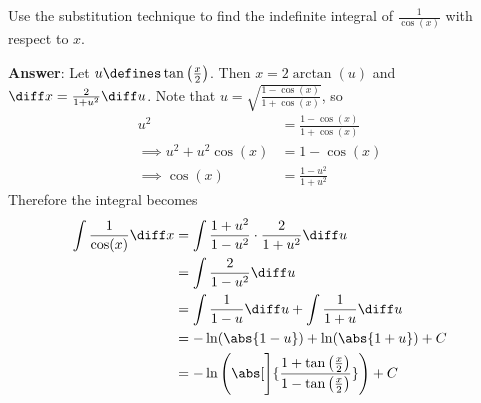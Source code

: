 \begin{exm}\label{exm-integration-using-substitution:4}
	Use the substitution technique to find the indefinite integral of $\tfrac{1}{\cos(x)}$ with respect to $x$.
	\begin{flushleft}
		\textbf{Answer}: Let $u \defines \tan\left(\tfrac{x}{2}\right)$. Then $x = 2\arctan(u)$
		and $\diff x = \tfrac{2}{1+u^2} \diff u$. Note that $u=\sqrt{\frac{1-\cos(x)}{1+\cos(x)}}$, so
		\begin{align*}
			u^2                       & = \frac{1-\cos(x)}{1+\cos(x)} \\
			\implies u^2 + u^2\cos(x) & = 1 - \cos(x)                 \\
			\implies \cos(x)          & = \frac{1-u^2}{1+u^2}
		\end{align*}
		Therefore the integral becomes
		\begin{align*}
			\int \frac{1}{\cos(x)} \diff x & = \int \frac{1+u^2}{1-u^2} \cdot \frac{2}{1+u^2} \diff u                                                  \\
			                               & = \int \frac{2}{1-u^2} \diff u                                                                            \\
			                               & = \int \frac{1}{1-u} \diff u + \int \frac{1}{1+u} \diff u                                                 \\
			                               & = -\ln(\abs{1-u}) + \ln(\abs{1+u}) + C                                                                    \\
			                               & = -\ln\left(\abs[\Bigg]{\frac{1+\tan\left(\frac{x}{2}\right)}{1-\tan\left(\frac{x}{2}\right)}}\right) + C \\
		\end{align*}
	\end{flushleft}
\end{exm}
